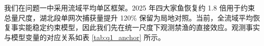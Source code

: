 我们在问题一中采用流域平均单区框架。2025 年四大家鱼恢复约 1.8 倍用于约束总量尺度，湖北段单网次捕获量提升 120\% 保留为局地对照。当前，全流域平均恢复事实能稳定约束模型，因此我们先在统一尺度下观测禁渔的直接效应。观测事实与模型变量的对应关系如表 \ref{tab:q1_anchor} 所示。
